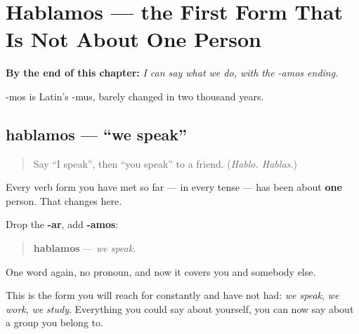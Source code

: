 
\chapter{Hablamos --- the First Form That Is Not About One Person}
\label{ch:spanish-hablamos}

\begin{chapteropening}
\textbf{By the end of this chapter:} \emph{I can say what we do, with the -amos ending.}

-mos is Latin's -mus, barely changed in two thousand years.
\end{chapteropening}

\section[hablamos]{hablamos — \textquotedblleft{}we speak\textquotedblright{}}

\label{lesson:ES-C07-hablamos}



\begin{quote}
Say \textquotedblleft{}I speak\textquotedblright{}, then \textquotedblleft{}you speak\textquotedblright{} to a friend. (\emph{Hablo. Hablas.})
\end{quote}

\begin{grammarlens}[title={Grammar Lens: the first form that is not about one person}]
Every verb form you have met so far — in every tense — has been about \textbf{one} person. That changes here.

Drop the \textbf{-ar}, add \textbf{-amos}:

\begin{quote}
\textbf{hablamos} — \emph{we speak.}
\end{quote}

One word again, no pronoun, and now it covers you and somebody else.

This is the form you will reach for constantly and have not had: \emph{we speak}, \emph{we work}, \emph{we study}. Everything you could say about yourself, you can now say about a group you belong to.
\end{grammarlens}


